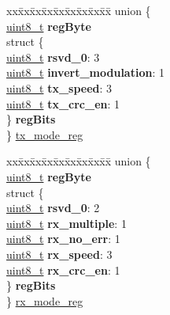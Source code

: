\begin{DoxyCompactItemize}
\begin{tabbing}
\end{tabbing}\item 
\begin{tabbing}
xx\=xx\=xx\=xx\=xx\=xx\=xx\=xx\=xx\=\kill
union \{\\
\>\hyperlink{vl53l0x__types_8h_aba7bc1797add20fe3efdf37ced1182c5}{uint8\_t} {\bfseries regByte}\\
\>struct \{\\
\>\>\hyperlink{vl53l0x__types_8h_aba7bc1797add20fe3efdf37ced1182c5}{uint8\_t} {\bfseries rsvd\_0}: 3\\
\>\>\hyperlink{vl53l0x__types_8h_aba7bc1797add20fe3efdf37ced1182c5}{uint8\_t} {\bfseries invert\_modulation}: 1\\
\>\>\hyperlink{vl53l0x__types_8h_aba7bc1797add20fe3efdf37ced1182c5}{uint8\_t} {\bfseries tx\_speed}: 3\\
\>\>\hyperlink{vl53l0x__types_8h_aba7bc1797add20fe3efdf37ced1182c5}{uint8\_t} {\bfseries tx\_crc\_en}: 1\\
\>\} {\bfseries regBits}\\
\} \hyperlink{structstruct_a1dd825787c2f3275c00463af6fb446a8}{tx\_mode\_reg}\\

\end{tabbing}\item 
\begin{tabbing}
xx\=xx\=xx\=xx\=xx\=xx\=xx\=xx\=xx\=\kill
union \{\\
\>\hyperlink{vl53l0x__types_8h_aba7bc1797add20fe3efdf37ced1182c5}{uint8\_t} {\bfseries regByte}\\
\>struct \{\\
\>\>\hyperlink{vl53l0x__types_8h_aba7bc1797add20fe3efdf37ced1182c5}{uint8\_t} {\bfseries rsvd\_0}: 2\\
\>\>\hyperlink{vl53l0x__types_8h_aba7bc1797add20fe3efdf37ced1182c5}{uint8\_t} {\bfseries rx\_multiple}: 1\\
\>\>\hyperlink{vl53l0x__types_8h_aba7bc1797add20fe3efdf37ced1182c5}{uint8\_t} {\bfseries rx\_no\_err}: 1\\
\>\>\hyperlink{vl53l0x__types_8h_aba7bc1797add20fe3efdf37ced1182c5}{uint8\_t} {\bfseries rx\_speed}: 3\\
\>\>\hyperlink{vl53l0x__types_8h_aba7bc1797add20fe3efdf37ced1182c5}{uint8\_t} {\bfseries rx\_crc\_en}: 1\\
\>\} {\bfseries regBits}\\
\} \hyperlink{structstruct_a7209689ecea0fda4ba3ccddf5234e452}{rx\_mode\_reg}\\

\end{tabbing}\end{DoxyCompactItemize}


